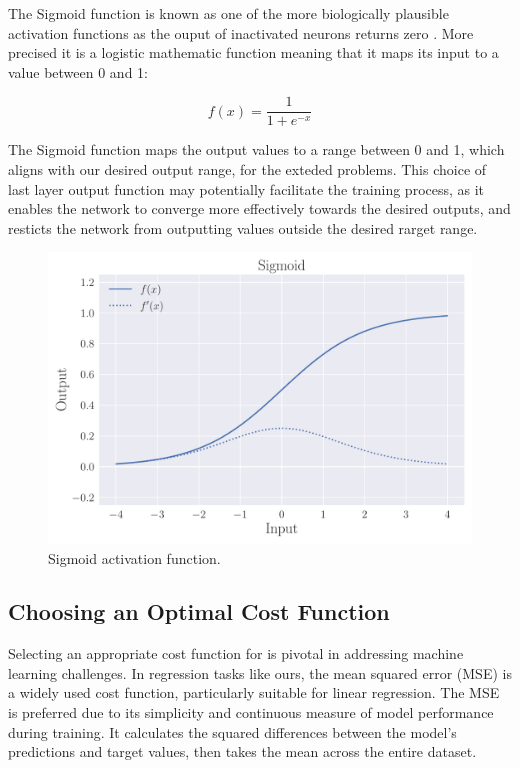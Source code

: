 \documentclass[a4paper, UKenglish, 11pt]{uiomaster}
\begin{document}
The Sigmoid function is known as one of the more biologically plausible activation functions as the ouput of inactivated neurons returns zero \cite{Jensen2022}. More precised it is a logistic mathematic function meaning that it maps its input to a value between 0 and 1:

\begin{equation}
  f(x) = \frac{1}{1 + e^{-x}}
\label{eq:Sigmoid}
\end{equation}

The Sigmoid function maps the output values to a range between 0 and 1, which aligns with our desired output range, for the exteded problems. This choice of last layer output function may potentially facilitate the training process, as it enables the network to converge more effectively towards the desired outputs, and resticts the network from outputting values outside the desired rarget range.

\begin{figure}
    \centering
    \includegraphics[width=\linewidth]{figures/Sigmoid.pdf}
    \caption{ Sigmoid activation function.}
    \label{fig:sigmoid}
\end{figure}


\subsection{Choosing an Optimal Cost Function}
Selecting an appropriate cost function for is pivotal in addressing machine learning challenges. In regression tasks like ours, the mean squared error (MSE) is a widely used cost function, particularly suitable for linear regression. The MSE is preferred due to its simplicity and continuous measure of model performance during training. It calculates the squared differences between the model's predictions and target values, then takes the mean across the entire dataset.
\end{document}
